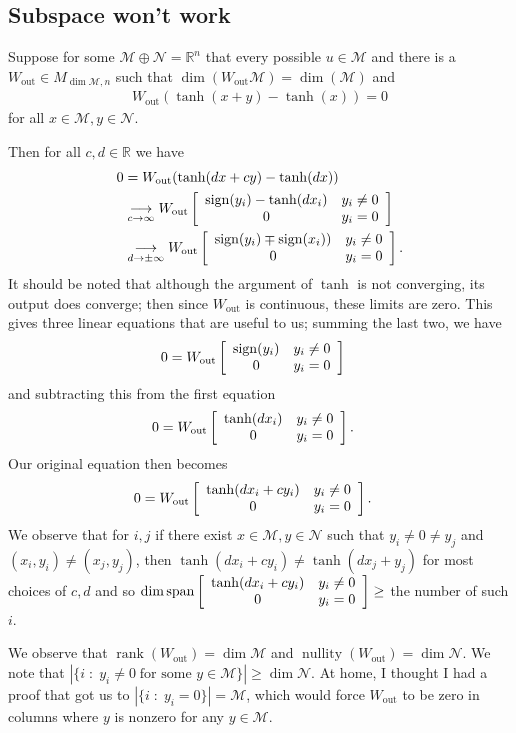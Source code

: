 \documentclass{article}
\newcommand{\mat}[2]{
    \IfInteger{#1}{
        \left[\begin{array}{*{#1}c} #2 \end{array}\right]
    }{
        \left[\begin{array}{#1} #2 \end{array}\right]}
    }
\newcommand{\Wout}{W_{\text{out}}}
\begin{document}
\subsection{Subspace won't work}

Suppose for some $\mathcal{M}\oplus \mathcal{N} = \mathbb{R}^n$ that every possible $u\in\mathcal{M}$ and there is a $\Wout\in M_{\dim \mathcal{M}, n}$ such that $\dim(\Wout\mathcal{M}) = \dim(\mathcal{M})$ and 
\begin{align*}
    \Wout ( \tanh(x + y) - \tanh(x)) = 0
\end{align*}
for all $x\in \mathcal{M}, y\in \mathcal{N}$. 

Then for all $c, d\in\mathbb{R}$ we have
\begin{align*}
    0&=\Wout ( \tanh(dx + cy) - \tanh(dx))
    \\
    &\underset{c\rightarrow\infty}{\longrightarrow} \Wout\mat{2}{\operatorname{sign}(y_i) - \tanh(dx_i) & y_i\neq 0 \\
    0 & y_i=0}
    \\
    &\underset{d\rightarrow\pm\infty}{\longrightarrow} \Wout\mat{2}{\operatorname{sign}(y_i) \mp \operatorname{sign}(x_i)) & y_i\neq 0 \\
    0 & y_i=0}.
\end{align*}
It should be noted that although the argument of $\tanh$ is not converging, its output does converge; then since $\Wout$ is continuous, these limits are zero. This gives three linear equations that are useful to us; summing the last two, we have
\begin{align*}
    0 &= \Wout\mat{2}{\operatorname{sign}(y_i) & y_i\neq 0 \\
    0 & y_i=0}
\end{align*}
and subtracting this from the first equation
\begin{align*}
    0 &= \Wout\mat{2}{\tanh(dx_i) & y_i\neq 0 \\
    0 & y_i=0}.
\end{align*}
Our original equation then becomes
\begin{align*}
    0 &= \Wout\mat{2}{\tanh(dx_i + cy_i) & y_i\neq 0 \\
    0 & y_i=0}.
\end{align*}
We observe that for $i, j$ if there exist $x\in\mathcal{M}, y\in\mathcal{N}$ such that $y_i\neq0\neq y_j$ and $(x_i, y_i)\neq(x_j,y_j)$, then $\tanh(dx_i + cy_i)\neq \tanh(dx_j + y_j)$ for most choices of $c,d$ and so $\dim \operatorname{span} \mat{2}{\tanh(dx_i + cy_i) & y_i\neq 0 \\
    0 & y_i=0} \geq $ the number of such $i$.

We observe that $\operatorname{rank}(\Wout) = \dim \mathcal{M}$ and $\operatorname{nullity}(\Wout) = \dim \mathcal{N}$. We note that $|\{i\;:\;y_i \neq 0\;\text{for some }y\in\mathcal{M}\}| \geq \dim \mathcal{N}$. At home, I thought I had a proof that got us to $|\{i\;:\;y_i = 0\}| = \mathcal{M}$, which would force $\Wout$ to be zero in columns where $y$ is nonzero for any $y\in\mathcal{M}$.
\end{document}
